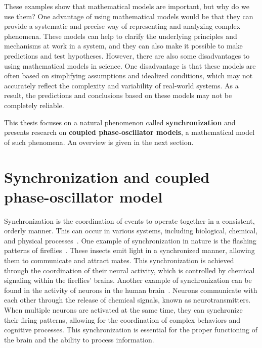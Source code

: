 These examples show that mathematical models are important, but why do we use them?
One advantage of using mathematical models would be that they can provide a systematic and precise way of representing and analyzing complex phenomena. These models can help to clarify the underlying principles and mechanisms at work in a system, and they can also make it possible to make predictions and test hypotheses.
However, there are also some disadvantages to using mathematical models in science. One disadvantage is that these models are often based on simplifying assumptions and idealized conditions, which may not accurately reflect the complexity and variability of real-world systems. As a result, the predictions and conclusions based on these models may not be completely reliable.

This thesis focuses on a natural phenomenon called \textbf{synchronization} and presents research on \textbf{coupled phase-oscillator models}, a mathematical model of such phenomena. An overview is given in the next section.

\section{Synchronization and coupled phase-oscillator model}

Synchronization is the coordination of events to operate together in a consistent, orderly manner. This can occur in various systems, including biological, chemical, and physical processes~\cite{strogatz2003}.
One example of synchronization in nature is the flashing patterns of fireflies~\cite{smith1935,buck1968}.
These insects emit light in a synchronized manner, allowing them to communicate and attract mates. This synchronization is achieved through the coordination of their neural activity, which is controlled by chemical signaling within the fireflies' brains.
Another example of synchronization can be found in the activity of neurons in the human brain~\cite{cossart2003,winfree1967,Lu2016}.
Neurons communicate with each other through the release of chemical signals, known as neurotransmitters. When multiple neurons are activated at the same time, they can synchronize their firing patterns, allowing for the coordination of complex behaviors and cognitive processes. This synchronization is essential for the proper functioning of the brain and the ability to process information.


